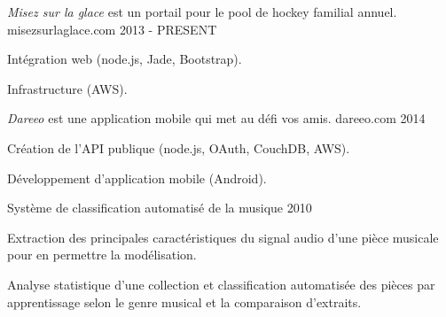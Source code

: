 
\begin{cventries}

  \cventry
    {\textit{Misez sur la glace} est un portail pour le pool de hockey familial annuel.} %
    {misezsurlaglace.com} %
    {} %
    {2013 - PRESENT} %
    {
      \begin{cvitems} %
        \item {Intégration web (node.js, Jade, Bootstrap).}
        \item {Infrastructure (AWS).}
      \end{cvitems}
    }

  \cventry
    {\textit{Dareeo} est une application mobile qui met au défi vos amis.} %
    {dareeo.com} %
    {} %
    {2014} %
    {
      \begin{cvitems} %
        \item {Création de l’API publique (node.js, OAuth, CouchDB, AWS).}
        \item {Développement d’application mobile (Android).}
      \end{cvitems}
    }

  \cventry
    {} %
    {Système de classification automatisé de la musique} %
    {} %
    {2010} %
    {
      \begin{cvitems} %
        \item {Extraction des principales caractéristiques du signal audio d'une pièce musicale pour en permettre la modélisation.}
        \item {Analyse statistique d'une collection et classification automatisée des pièces par apprentissage selon le genre musical et la comparaison d'extraits.}
      \end{cvitems}
    }

\end{cventries}